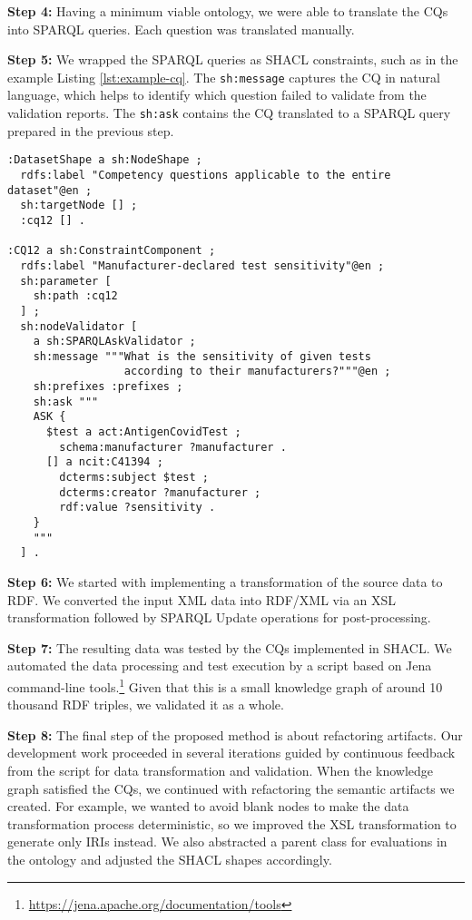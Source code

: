 \documentclass[
]{ceurart}
\begin{document}
\textbf{Step 4:} Having a minimum viable ontology, we were able to translate the CQs into SPARQL queries. Each question was translated manually.

\textbf{Step 5:} We wrapped the SPARQL queries as SHACL constraints, such as in the example Listing \ref{lst:example-cq}. The \texttt{sh:message} captures the CQ in natural language, which helps to identify which question failed to validate from the validation reports.  The \texttt{sh:ask} contains the CQ translated to a SPARQL query prepared in the previous step.

\begin{lstlisting}[language=turtle, caption=Example competency question in SHACL,label={lst:example-cq}]
:DatasetShape a sh:NodeShape ;
  rdfs:label "Competency questions applicable to the entire dataset"@en ;
  sh:targetNode [] ;
  :cq12 [] .

:CQ12 a sh:ConstraintComponent ;
  rdfs:label "Manufacturer-declared test sensitivity"@en ;
  sh:parameter [
    sh:path :cq12
  ] ;
  sh:nodeValidator [
    a sh:SPARQLAskValidator ;
    sh:message """What is the sensitivity of given tests
                  according to their manufacturers?"""@en ;
    sh:prefixes :prefixes ;
    sh:ask """
    ASK {
      $test a act:AntigenCovidTest ;
        schema:manufacturer ?manufacturer .
      [] a ncit:C41394 ;
        dcterms:subject $test ;
        dcterms:creator ?manufacturer ;
        rdf:value ?sensitivity .
    }
    """
  ] .
\end{lstlisting}

\textbf{Step 6:} We started with implementing a transformation of the source data to RDF. We converted the input XML data into RDF/XML via an XSL transformation followed by SPARQL Update operations for post-processing.

\textbf{Step 7:} The resulting data was tested by the CQs implemented in SHACL. We automated the data processing and test execution by a script based on Jena command-line tools.\footnote{\url{https://jena.apache.org/documentation/tools}} Given that this is a small knowledge graph of around 10 thousand RDF triples, we validated it as a whole.

\textbf{Step 8:} The final step of the proposed method is about refactoring artifacts. Our development work proceeded in several iterations guided by continuous feedback from the script for data transformation and validation. When the knowledge graph satisfied the CQs, we continued with refactoring the semantic artifacts we created. For example, we wanted to avoid blank nodes to make the data transformation process deterministic, so we improved the XSL transformation to generate only IRIs instead. We also abstracted a parent class for evaluations in the ontology and adjusted the SHACL shapes accordingly.
\end{document}
